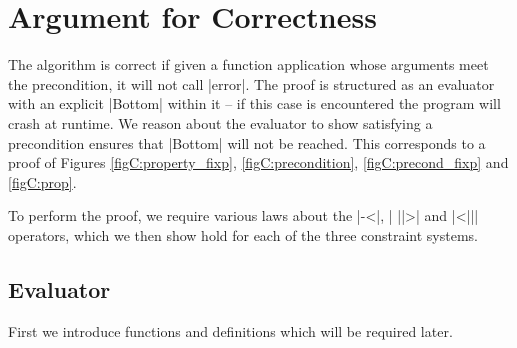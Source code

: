 \section{Argument for Correctness}
\label{secC:correct}

\newcommand{\lemma}[1]{(\textit{#1})}
\newcommand{\theorem}[2]{#2 \hspace{5mm} \lemma{#1} \\}
\newcommand{\proof}[2][]{\paragraph{\lemma{#2} \textsf{#1}}}

The algorithm is correct if given a function application whose arguments meet the precondition, it will not call |error|. The proof is structured as an evaluator with an explicit |Bottom| within it -- if this case is encountered the program will crash at runtime. We reason about the evaluator to show satisfying a precondition ensures that |Bottom| will not be reached. This corresponds to a proof of Figures \ref{figC:property_fixp}, \ref{figC:precondition}, \ref{figC:precond_fixp} and \ref{figC:prop}.

To perform the proof, we require various laws about the |-<|, | ||>| and |<||| operators, which we then show hold for each of the three constraint systems.

\subsection{Evaluator}

First we introduce functions and definitions which will be required later.


